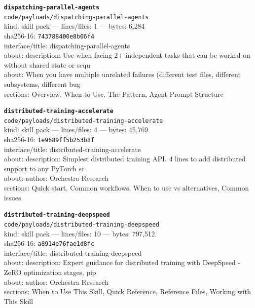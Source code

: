 \noindent\textbf{\texttt{dispatching-parallel-agents}}\\
\texttt{code/payloads/dispatching-parallel-agents}\\
kind: skill pack --- lines/files: 1 --- bytes: 6,284\\
sha256-16: \texttt{743788400e8b06f4}\\
interface/title: dispatching-parallel-agents\\
about: description: Use when facing 2+ independent tasks that can be worked on without shared state or sequ\\
about: When you have multiple unrelated failures (different test files, different subsystems, different bug\\
sections: Overview, When to Use, The Pattern, Agent Prompt Structure\\
\vspace*{6.0pt}

\noindent\textbf{\texttt{distributed-training-accelerate}}\\
\texttt{code/payloads/distributed-training-accelerate}\\
kind: skill pack --- lines/files: 4 --- bytes: 45,769\\
sha256-16: \texttt{1e9689ff5b253b8f}\\
interface/title: distributed-training-accelerate\\
about: description: Simplest distributed training API. 4 lines to add distributed support to any PyTorch sc\\
about: author: Orchestra Research\\
sections: Quick start, Common workflows, When to use vs alternatives, Common issues\\
\vspace*{6.0pt}

\noindent\textbf{\texttt{distributed-training-deepspeed}}\\
\texttt{code/payloads/distributed-training-deepspeed}\\
kind: skill pack --- lines/files: 10 --- bytes: 797,512\\
sha256-16: \texttt{a8914e76fae1d8fc}\\
interface/title: distributed-training-deepspeed\\
about: description: Expert guidance for distributed training with DeepSpeed - ZeRO optimization stages, pip\\
about: author: Orchestra Research\\
sections: When to Use This Skill, Quick Reference, Reference Files, Working with This Skill\\
\vspace*{6.0pt}

